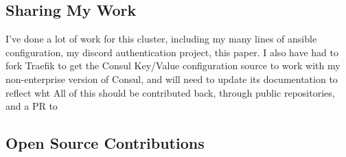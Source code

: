 \documentclass{article}
\begin{document}
\subsection*{Sharing My Work}
I've done a lot of work for this cluster, including my many lines of ansible configuration, my discord authentication project, this paper. I also have had to fork Traefik to get the Consul Key/Value configuration source to work with my non-enterprise version of Consul, and will need to update its documentation to reflect wht  All of this should be contributed back, through public repositories, and a PR to 
\subsection*{Open Source Contributions}
\end{document}
